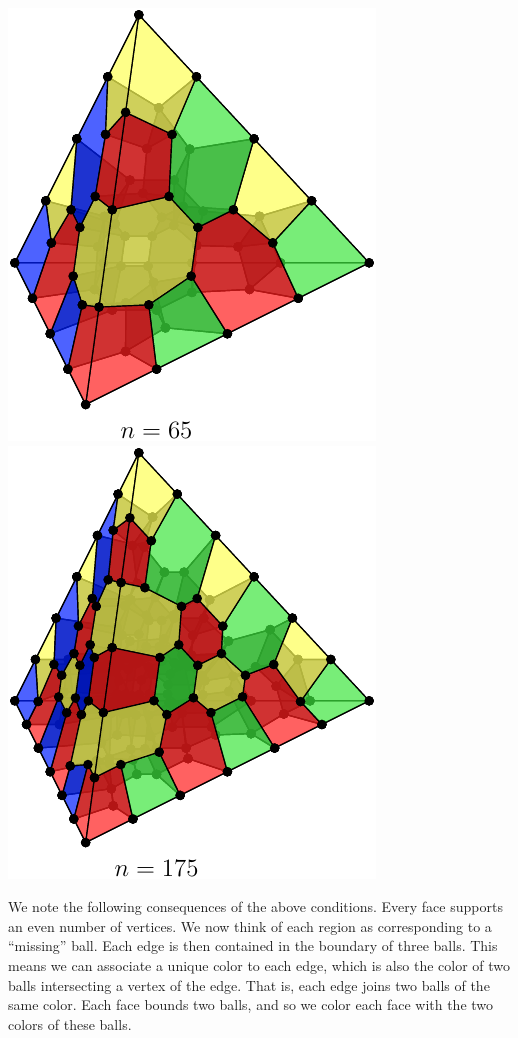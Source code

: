 \begin{center}
\includegraphics{pic-gcolor-2.pdf}\ \ \ \ \ \ \ \ \ \   \includegraphics{pic-gcolor-3.pdf}
\end{center}

We note the following consequences of the above conditions.
Every face supports an even number of vertices.
We now think of each region as corresponding to a ``missing'' ball.
Each edge is then contained in the boundary of three balls.
This means we can associate a unique color to each edge,
which is also the color of two balls intersecting a vertex of the edge.
That is, each edge joins two balls of the same color.
Each face bounds two balls, and so we color each face with the two colors of these balls.

